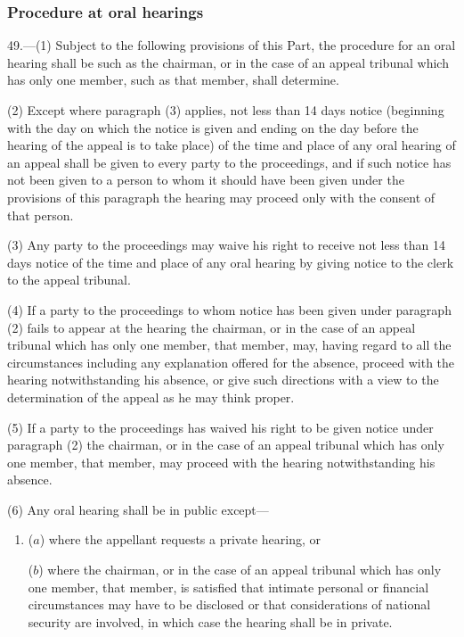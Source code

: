 \documentclass[12pt,a4paper]{article}
\begin{document}
\renewcommand\parthead{--- Part V Chapter IV}

\subsubsection[49. Procedure at oral hearings]{Procedure at oral hearings}

49.—(1) Subject to the following provisions of this Part, the procedure for an oral hearing shall be such as the chairman, or in the case of an appeal tribunal which has only one member, such as that member, shall determine.

(2) Except where paragraph (3) applies, not less than 14 days notice (beginning with the day on which the notice is given and ending on the day before the hearing of the appeal is to take place) of the time and place of any oral hearing of an appeal shall be given to every party to the proceedings, and if such notice has not been given to a person to whom it should have been given under the provisions of this paragraph the hearing may proceed only with the consent of that person.

(3) Any party to the proceedings may waive his right to receive not less than 14 days notice of the time and place of any oral hearing by giving notice to the clerk to the appeal tribunal.

(4) If a party to the proceedings to whom notice has been given under paragraph (2) fails to appear at the hearing the chairman, or in the case of an appeal tribunal which has only one member, that member, may, having regard to all the circumstances including any explanation offered for the absence, proceed with the hearing notwithstanding his absence, or give such directions with a view to the determination of the appeal as he may think proper.

(5) If a party to the proceedings has waived his right to be given notice under paragraph (2) the chairman, or in the case of an appeal tribunal which has only one member, that member, may proceed with the hearing notwithstanding his absence.

(6) Any oral hearing shall be in public except—
\begin{enumerate}\item[]
($a$) where the appellant requests a private hearing, or

($b$) where the chairman, or in the case of an appeal tribunal which has only one member, that member, is satisfied that intimate personal or financial circumstances may have to be disclosed or that considerations of national security are involved, in which case the hearing shall be in private.
\end{enumerate}
\end{document}
